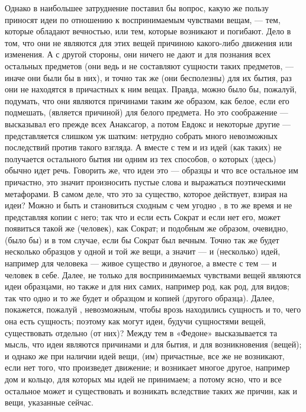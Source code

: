 \documentclass{article}
\begin{document}
Однако в наибольшее затруднение поставил бы вопрос, какую же пользу приносят идеи по отношению к воспринимаемым чувствами вещам, — тем, которые обладают вечностью, или тем, которые возникают и погибают. Дело в том, что они не являются для этих вещей причиною какого-либо движения или изменения. А с другой стороны, они ничего не дают и для познания всех остальных предметов (они ведь и не составляют сущности таких предметов, — иначе они были бы в них), и точно так же (они бесполезны) для их бытия, раз они не находятся в причастных к ним вещах. Правда, можно было бы, пожалуй, подумать, что они являются причинами таким же образом, как белое, если его подмешать, (является причиной) для белого предмета. Но это соображение — высказывал его прежде всех Анаксагор, а потом Евдокс и некоторые другие — представляется слишком уж шатким: нетрудно собрать много невозможных последствий против такого взгляда. А вместе с тем и из идей (как таких)
\footnotemark[16]
не получается остального бытия ни одним из тех способов, о которых (здесь) обычно идет речь.
\footnotemark[17]
Говорить же, что идеи это — образцы и что все остальное им причастно, это значит произносить пустые слова и выражаться поэтическими метафорами. В самом деле, что это за существо, которое действует, взирая на идеи? Можно и быть и становиться сходным с чем угодно
\footnotemark[18]
, в то же время и не представляя копии с него; так что и если есть Сократ и если нет его, может появиться такой же (человек), как Сократ; и подобным же образом, очевидно, (было бы) и в том случае, если бы Сократ был вечным. Точно так же будет несколько образцов у одной и той же вещи, а значит — и (несколько) идей, например для человека — живое существо и двуногое, а вместе с тем — и человек в себе. Далее, не только для воспринимаемых чувствами вещей являются идеи образцами, но также и для них самих, например род, как род, для видов; так что одно и то же будет и образцом и копией (другого образца). Далее, покажется, пожалуй
\footnotemark[19]
, невозможным, чтобы врозь находились сущность и то, чего она есть сущность; поэтому как могут идеи, будучи сущностями вещей, существовать отдельно (от них)? Между тем в «Федоне» высказывается та мысль, что идеи являются причинами и для бытия, и для возникновения (вещей); и однако же при наличии идей вещи, (им) причастные, все же не возникают, если нет того, что произведет движение; и возникает многое другое, например дом и кольцо, для которых мы идей не принимаем; а потому ясно, что и все остальное
\footnotemark[20]
может и существовать и возникать вследствие таких же причин, как и вещи, указанные сейчас.
\footnotemark[21]
\end{document}

